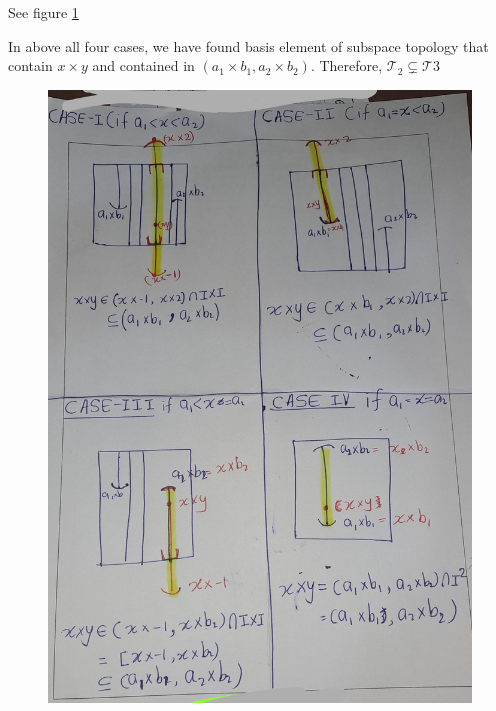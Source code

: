 \documentclass[
]{book}
\theoremstyle{definition}
\theoremstyle{definition}
\theoremstyle{definition}
\theoremstyle{definition}
\theoremstyle{remark}
\begin{document}
See figure \ref{fig:fige15}

In above all four cases, we have found basis element of subspace topology that contain \(x\times y\) and contained in \((a_1\times b_1, a_2 \times b_2)\). Therefore, \(\mathcal{T_2}\subsetneq\mathcal{T3}\)

\begin{figure}
\centering
\includegraphics{figures/figure 15.jpg}
\caption{\label{fig:fige15}\(~\)}
\end{figure}
\end{document}
